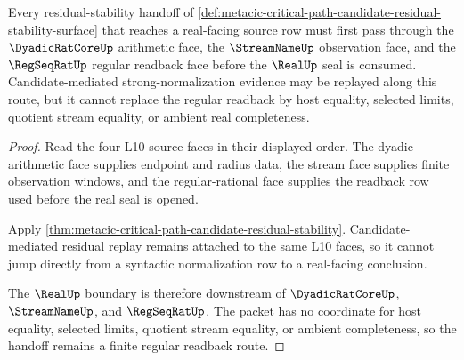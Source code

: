 \begin{theorem}
\label{thm:metacic-critical-path-real-regular-handoff}
Every residual-stability handoff of \autoref{def:metacic-critical-path-candidate-residual-stability-surface} that reaches a real-facing source row must first pass through the $\DyadicRatCoreUp$ arithmetic face, the $\StreamNameUp$ observation face, and the $\RegSeqRatUp$ regular readback face before the $\RealUp$ seal is consumed. Candidate-mediated strong-normalization evidence may be replayed along this route, but it cannot replace the regular readback by host equality, selected limits, quotient stream equality, or ambient real completeness.
\end{theorem}
\begin{proof}
Read the four L10 source faces in their displayed order. The dyadic arithmetic face supplies endpoint and radius data, the stream face supplies finite observation windows, and the regular-rational face supplies the readback row used before the real seal is opened.

Apply \autoref{thm:metacic-critical-path-candidate-residual-stability}. Candidate-mediated residual replay remains attached to the same L10 faces, so it cannot jump directly from a syntactic normalization row to a real-facing conclusion.

The $\RealUp$ boundary is therefore downstream of $\DyadicRatCoreUp$, $\StreamNameUp$, and $\RegSeqRatUp$. The packet has no coordinate for host equality, selected limits, quotient stream equality, or ambient completeness, so the handoff remains a finite regular readback route.
\end{proof}

